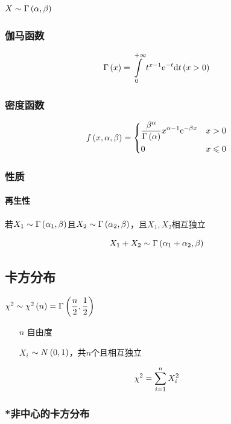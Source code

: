 \documentclass{article}
\begin{document}
$X\sim\Gamma\left(\alpha,\beta\right)$

\subsubsection{伽马函数}

\[\Gamma\left(x\right)=\int\limits_0^{+\infty}t^{x-1}\mathrm e^{-t}\mathrm d t\left(x>0\right)\]

\subsubsection{密度函数}

\[f\left(x,\alpha,\beta\right)=
    \left\{\begin{aligned}
         & \frac{\beta^\alpha}{\Gamma\left(\alpha\right)}x^{\alpha-1}\mathrm e^{-\beta x} &  & x>0         \\
         & 0                                                              &  & x\leqslant0
    \end{aligned}\right.\]

\subsubsection{性质}

\paragraph{再生性}

若$X_1\sim\Gamma\left(\alpha_1,\beta\right)$且$X_2\sim\Gamma\left(\alpha_2,\beta\right)$，且$X_1,X_2$相互独立

\[X_1+X_2\sim\Gamma\left(\alpha_1+\alpha_2,\beta\right)\]

\subsection{卡方分布}

$\chi^2\sim\chi^2\left(n\right)=\Gamma\left(\dfrac n2,\dfrac12\right)$

\begin{enumerate}
    \item [$n$] 自由度
    \item [$X_i$] $\sim N\left(0,1\right)$，共$n$个且相互独立
\end{enumerate}

\[\chi^2=\sum\limits_{i=1}^n X_i^2\]

\subsubsection{*非中心的卡方分布}
\end{document}
